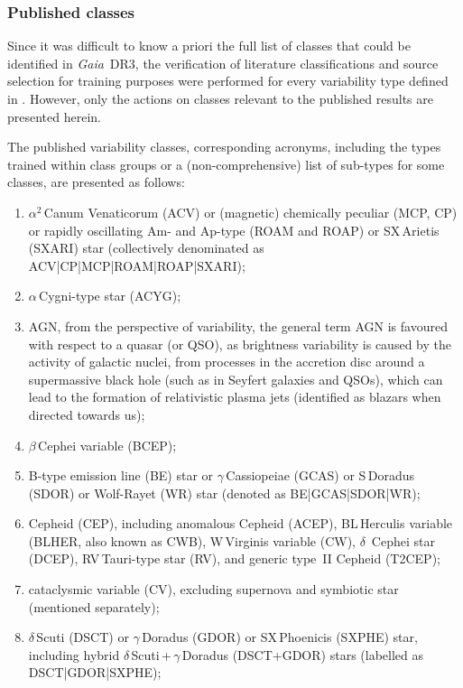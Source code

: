 \documentclass[longauth]{aa}
\def\gdr3{\textit{Gaia}~DR3\xspace}
\begin{document}
\subsubsection{Published classes\label{sssec:classes}}

Since it was difficult to know a priori the full list of classes that could be identified in \gdr3, the verification of literature classifications and source selection for training purposes were performed for every variability type defined in \citet{DR3-DPACP-177}. However, only the actions on classes relevant to the published results are presented herein.

The published variability classes, corresponding acronyms, including the types trained within class groups or a (non-comprehensive) list of sub-types for some classes, are presented as follows:
\begin{enumerate}
  \item $\alpha^2$\,Canum Venaticorum (ACV) or (magnetic) chemically peculiar (MCP, CP) or rapidly oscillating Am- and Ap-type (ROAM and ROAP) or SX\,Arietis (SXARI) star (collectively denominated as ACV|CP|MCP|ROAM|ROAP|SXARI); 
  \item $\alpha$\,Cygni-type star (ACYG);
  \item AGN, from the perspective of variability, the general term AGN is favoured with respect to a quasar (or QSO), as brightness variability is caused by the activity of galactic nuclei, from processes in the accretion disc around a supermassive black hole (such as in Seyfert galaxies and QSOs), which can lead to the formation of relativistic plasma jets (identified as blazars when directed towards us);  
  \item $\beta$\,Cephei variable (BCEP);
  \item B-type emission line (BE) star or $\gamma$\,Cassiopeiae (GCAS) or S\,Doradus (SDOR) or Wolf-Rayet (WR) star (denoted as BE|GCAS|SDOR|WR);
  \item Cepheid (CEP), including anomalous Cepheid (ACEP), BL\,Herculis variable (BLHER, also known as CWB), W\,Virginis variable (CW), $\delta$~Cephei star (DCEP), RV\,Tauri-type star (RV), and generic type~II Cepheid (T2CEP);
  \item cataclysmic variable (CV), excluding supernova and symbiotic star (mentioned separately);
  \item $\delta$\,Scuti (DSCT) or $\gamma$\,Doradus (GDOR) or SX\,Phoenicis (SXPHE) star, including hybrid $\delta$\,Scuti\,+\,$\gamma$\,Doradus (DSCT+GDOR) stars (labelled as DSCT|GDOR|SXPHE);

\end{enumerate}
\end{document}
